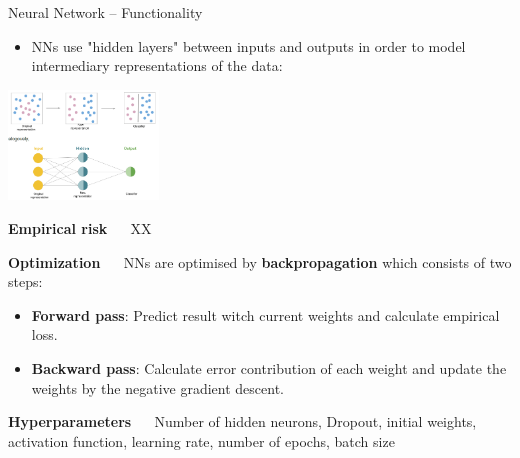 \documentclass[11pt,compress,t,notes=noshow, xcolor=table]{beamer}
\newcommand{\highlight}[1]{\textcolor{highlightcol}{\textbf{#1}}}
\begin{document}
\begin{frame}{Neural Network -- Functionality}

\footnotesize

\begin{itemize}

\item NNs use "hidden layers" between inputs and outputs in order to model intermediary representations of the data: 

\end{itemize}



\medskip
  \centering
  \includegraphics[width=0.3\textwidth]{figure/nn_representation_learning.png}



\medskip



\highlight{Empirical risk} ~~ XX

% 
%   
%   
% 
% 
 \medskip

\highlight{Optimization} ~~ NNs are optimised by \textbf{backpropagation} which consists of two steps:
\begin{itemize}
  \item \textbf{Forward pass}: Predict result witch current weights and calculate empirical loss. 
  \item \textbf{Backward pass}: Calculate error contribution of each weight and update the weights by the negative gradient descent. 
\end{itemize}

\medskip

\highlight{Hyperparameters} ~~ Number of hidden neurons, Dropout, initial weights, activation function, learning rate, number of epochs, batch size

\end{frame}
\end{document}
